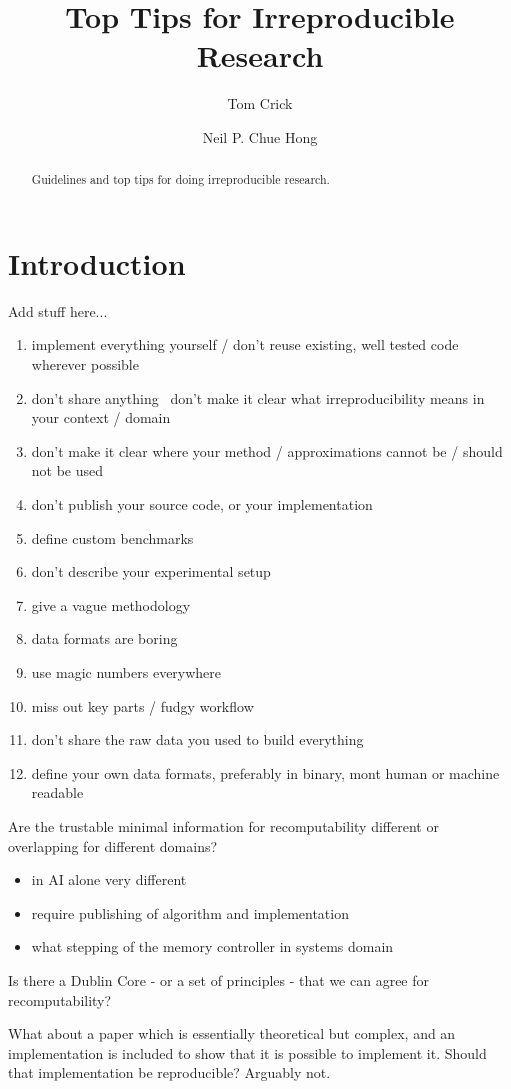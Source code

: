 \documentclass[a4paper,11pt]{article}
\title{Top Tips for Irreproducible Research}
\author[1]{Tom Crick}
\author[2]{Neil P. Chue Hong}
\affil[1]{Department of Computing \& Information Systems, Cardiff
  Metropolitan University}
\affil[2]{Software Sustainability Institute, University of Edinburgh}
\affil[1]{\protect\url{tcrick@cardiffmet.ac.uk}}
\affil[2]{\protect\url{N.ChueHong@software.ac.uk}}
\date{ }
\begin{document}
\maketitle

\begin{abstract}
Guidelines and top tips for doing irreproducible research.
\end{abstract}

\section{Introduction}
Add stuff here...


\begin{enumerate}
\item implement everything yourself / don't reuse existing, well tested code wherever possible
\item  don't share anything
\ don't make it clear what irreproducibility means in your context / domain
\item don't make it clear where your method / approximations cannot be / should not be used
\item don't publish your source code, or your implementation
\item  define custom benchmarks
\item  don't describe your experimental setup
\item  give a vague methodology
\item  data formats are boring
\item  use magic numbers everywhere
\item  miss out key parts / fudgy workflow
\item  don't share the raw data you used to build everything
\item  define your own data formats, preferably in binary, mont human or machine readable
\end{enumerate}


Are the trustable minimal information for recomputability  different or overlapping for different domains?
\begin{itemize}
\item in AI alone very different
\item require publishing of algorithm and implementation
\item what stepping of the memory controller in systems domain
\end{itemize}

Is there a Dublin Core - or a set of principles - that we can agree for recomputability?

What about a paper which is essentially theoretical but complex, and an implementation is included to show that it is possible to implement it. Should that implementation be reproducible? Arguably not.



%
%
\end{document}
